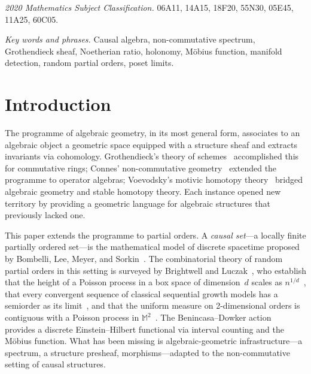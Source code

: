 \documentclass[11pt,a4paper]{article}
\theoremstyle{plain}
\theoremstyle{definition}
\theoremstyle{remark}
\begin{document}
\medskip

\noindent\textit{2020 Mathematics Subject Classification.}
06A11, 14A15, 18F20, 55N30, 05E45, 11A25, 60C05.

\smallskip

\noindent\textit{Key words and phrases.}
Causal algebra, non-commutative spectrum, Grothendieck sheaf, Noetherian ratio, holonomy, M\"obius function, manifold detection, random partial orders, poset limits.

\bigskip


\section{Introduction}

The programme of algebraic geometry, in its most general form, associates to an algebraic object a geometric space equipped with a structure sheaf and extracts invariants via cohomology.
Grothendieck's theory of schemes~\cite{grothendieck1960} accomplished this for commutative rings; Connes' non-commutative geometry~\cite{connes1994} extended the programme to operator algebras; Voevodsky's motivic homotopy theory~\cite{voevodsky2003} bridged algebraic geometry and stable homotopy theory.
Each instance opened new territory by providing a geometric language for algebraic structures that previously lacked one.

This paper extends the programme to partial orders.
A \emph{causal set}---a locally finite partially ordered set---is the mathematical model of discrete spacetime proposed by Bombelli, Lee, Meyer, and Sorkin~\cite{bombelli1987}.
The combinatorial theory of random partial orders in this setting is surveyed by Brightwell and Luczak~\cite{brightwell2015}, who establish that the height of a Poisson process in a box space of dimension~$d$ scales as $n^{1/d}$~\cite{bollobas1991}, that every convergent sequence of classical sequential growth models has a semiorder as its limit~\cite{brightwell2010}, and that the uniform measure on 2-dimensional orders is contiguous with a Poisson process in $\mathbb{M}^2$~\cite{brightwell2008}.
The Benincasa--Dowker action~\cite{benincasa2010} provides a discrete Einstein--Hilbert functional via interval counting and the M\"obius function.
What has been missing is algebraic-geometric infrastructure---a spectrum, a structure presheaf, morphisms---adapted to the non-commutative setting of causal structures.
\end{document}

